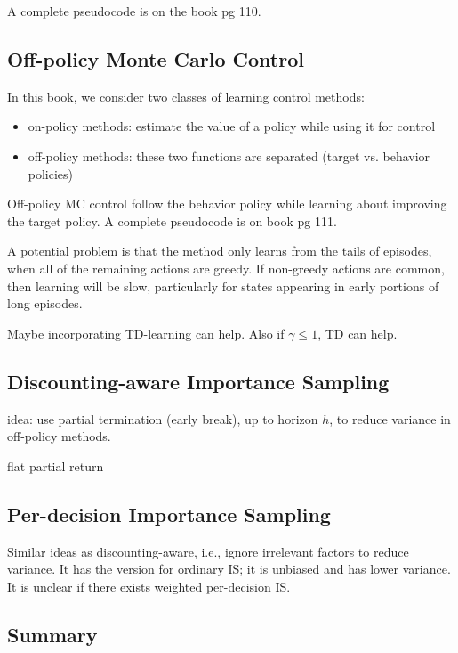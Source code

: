 \documentclass[sutton_barto_notes.tex]{subfiles}
\begin{document}
A complete pseudocode is on the book pg 110.


\subsection{Off-policy Monte Carlo Control}

In this book, we consider two classes of learning control methods:
\begin{itemize}
\item on-policy methods: estimate the value of a policy while using it for control
\item off-policy methods: these two functions are separated (target vs. behavior policies)
\end{itemize}

Off-policy MC control follow the behavior policy while learning about improving the target policy. A complete pseudocode is on book pg 111.

A potential problem is that the method only learns from the tails of episodes, when all of the remaining actions are greedy. If non-greedy actions are common, then learning will be slow, particularly for states appearing in early portions of long episodes.

Maybe incorporating TD-learning can help. Also if $\gamma \leq 1$, TD can help.

\subsection{Discounting-aware Importance Sampling}
idea: use partial termination (early break), up to horizon $h$, to reduce variance in off-policy methods.

flat partial return
\subsection{Per-decision Importance Sampling}
Similar ideas as discounting-aware, i.e., ignore irrelevant factors to reduce variance.
It has the version for ordinary IS; it is unbiased and has lower variance. It is unclear if there exists weighted per-decision IS.

\subsection{Summary}
\end{document}
